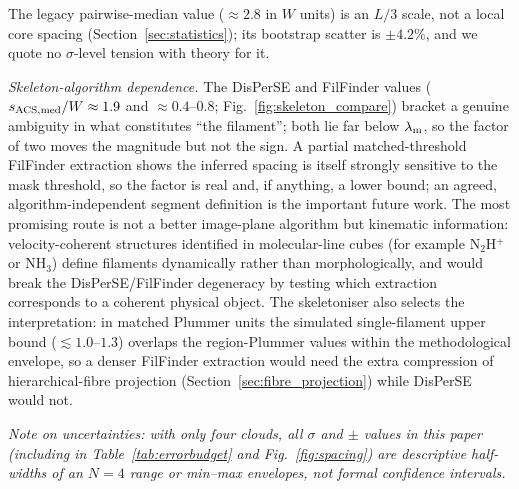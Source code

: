 \documentclass[usenatbib,twoside,twocolumn]{mnras}
\begin{document}
The legacy pairwise-median value ($\approx2.8$ in $W$ units) is an $L/3$ scale, not a local core spacing (Section~\ref{sec:statistics}); its bootstrap scatter is $\pm4.2\%$, and we quote no $\sigma$-level tension with theory for it.

\emph{Skeleton-algorithm dependence.} The DisPerSE and FilFinder values ($s_{\rm ACS,med}/W\approx1.9$ and $\approx0.4$--$0.8$; Fig.~\ref{fig:skeleton_compare}) bracket a genuine ambiguity in what constitutes ``the filament''; both lie far below $\lambda_{\rm m}$, so the factor of two moves the magnitude but not the sign. A partial matched-threshold FilFinder extraction shows the inferred spacing is itself strongly sensitive to the mask threshold, so the factor is real and, if anything, a lower bound; an agreed, algorithm-independent segment definition is the important future work. The most promising route is not a better image-plane algorithm but kinematic information: velocity-coherent structures identified in molecular-line cubes (for example N$_2$H$^+$ or NH$_3$) define filaments dynamically rather than morphologically, and would break the DisPerSE/FilFinder degeneracy by testing which extraction corresponds to a coherent physical object. The skeletoniser also selects the interpretation: in matched Plummer units the simulated single-filament upper bound ($\lesssim1.0$--$1.3$) overlaps the region-Plummer values within the methodological envelope, so a denser FilFinder extraction would need the extra compression of hierarchical-fibre projection (Section~\ref{sec:fibre_projection}) while DisPerSE would not.

\noindent\emph{Note on uncertainties: with only four clouds, all $\sigma$ and $\pm$ values in this paper (including in Table~\ref{tab:errorbudget} and Fig.~\ref{fig:spacing}) are descriptive half-widths of an $N=4$ range or min--max envelopes, not formal confidence intervals.}
\end{document}
